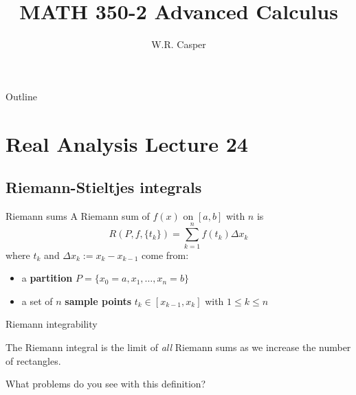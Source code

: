 \documentclass{beamer}
\title{MATH 350-2 Advanced Calculus}
\subtitle
{} %
\author[W.R. Casper] %
{W.R. Casper}
\institute[California State University Fullerton] %
{
  Department of Mathematics\\
  California State University Fullerton}
\begin{document}
\begin{frame}
  \titlepage
\end{frame}

\begin{frame}{Outline}
  \tableofcontents
\end{frame}



\section{Real Analysis Lecture 24}

\subsection{Riemann-Stieltjes integrals}

\begin{frame}{Riemann sums}
A Riemann sum of $f(x)$ on $[a,b]$ with $n$ is
$$R(P,f,\{t_k\}) = \sum_{k=1}^n f(t_k)\Delta x_k$$
\pause
where $t_k$ and $\Delta x_k := x_k-x_{k-1}$ come from:
\begin{itemize}
\pause
\item a \textbf{partition} $P =\{x_0=a,x_1,\dots, x_n=b\}$
\pause
\item a set of $n$ \textbf{sample points} $t_k\in [x_{k-1},x_k]$ with $1\leq k\leq n$
\end{itemize}
\end{frame}

\begin{frame}{Riemann integrability}
\begin{defn}
The Riemann integral is the limit of \emph{all} Riemann sums as we increase the number of rectangles.
\end{defn}
\pause
\begin{quest}
What problems do you see with this definition?
\end{quest}
\end{frame}
\end{document}

